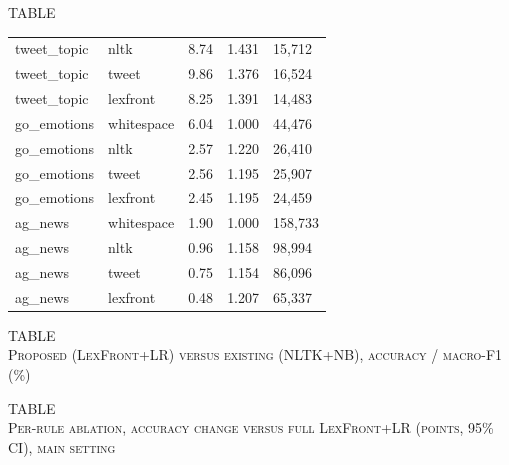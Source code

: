 \documentclass[journal,onecolumn,12pt,a4paper]{IEEEtran}
\begin{document}
\begin{table}[!t]
\begin{minipage}[t]{0.485\textwidth}
\begin{center}{\footnotesize TABLE~\thetable}
{\begin{tabular}{lllll}
tweet\_topic & nltk & 8.74 & 1.431 & 15,712 \\
tweet\_topic & tweet & 9.86 & 1.376 & 16,524 \\
tweet\_topic & lexfront & 8.25 & 1.391 & 14,483 \\
go\_emotions & whitespace & 6.04 & 1.000 & 44,476 \\
go\_emotions & nltk & 2.57 & 1.220 & 26,410 \\
go\_emotions & tweet & 2.56 & 1.195 & 25,907 \\
go\_emotions & lexfront & 2.45 & 1.195 & 24,459 \\
ag\_news & whitespace & 1.90 & 1.000 & 158,733 \\
ag\_news & nltk & 0.96 & 1.158 & 98,994 \\
ag\_news & tweet & 0.75 & 1.154 & 86,096 \\
ag\_news & lexfront & 0.48 & 1.207 & 65,337 \\
\bottomrule
\end{tabular}
}
\end{center}\vspace{4pt}
\label{tab:5}\begin{center}{\footnotesize TABLE~\thetable}\\[1pt]{\footnotesize\textsc{Proposed (LexFront+LR) versus existing (NLTK+NB), accuracy / macro-F1 (\%)}}\\[3pt]
\footnotesize
\setlength{\tabcolsep}{4pt}
\end{center}\vspace{4pt}
\label{tab:6}\begin{center}{\footnotesize TABLE~\thetable}\\[1pt]{\footnotesize\textsc{Per-rule ablation, accuracy change versus full LexFront+LR (points, 95\% CI), main setting}}\\[3pt]

\end{center}
\end{minipage}
\end{table}
\end{document}

